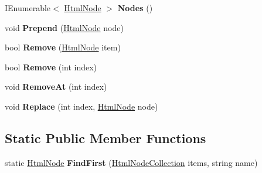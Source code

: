 \begin{DoxyCompactItemize}
I\+Enumerable$<$ \hyperlink{class_html_agility_pack_1_1_html_node}{Html\+Node} $>$ {\bfseries Nodes} ()
\item 
\mbox{\label{class_html_agility_pack_1_1_html_node_collection_a78673ebcce85f224de5cd11f807ed319}} 
void {\bfseries Prepend} (\hyperlink{class_html_agility_pack_1_1_html_node}{Html\+Node} node)
\item 
\mbox{\label{class_html_agility_pack_1_1_html_node_collection_a4c67bb2596e9bfe3bb1b43fd3e28236f}} 
bool {\bfseries Remove} (\hyperlink{class_html_agility_pack_1_1_html_node}{Html\+Node} item)
\item 
\mbox{\label{class_html_agility_pack_1_1_html_node_collection_a6ffb19c5be316377dcc9f53f45f70653}} 
bool {\bfseries Remove} (int index)
\item 
\mbox{\label{class_html_agility_pack_1_1_html_node_collection_a727c555fa02ff5573eb375bc7cf657ac}} 
void {\bfseries Remove\+At} (int index)
\item 
\mbox{\label{class_html_agility_pack_1_1_html_node_collection_ae1f50126a6ef764fef65077c61a50539}} 
void {\bfseries Replace} (int index, \hyperlink{class_html_agility_pack_1_1_html_node}{Html\+Node} node)
\end{DoxyCompactItemize}
\subsection*{Static Public Member Functions}
\begin{DoxyCompactItemize}
\item 
\mbox{\label{class_html_agility_pack_1_1_html_node_collection_a0475c613be6aca340e6794722f15915c}} 
static \hyperlink{class_html_agility_pack_1_1_html_node}{Html\+Node} {\bfseries Find\+First} (\hyperlink{class_html_agility_pack_1_1_html_node_collection}{Html\+Node\+Collection} items, string name)
\end{DoxyCompactItemize}
